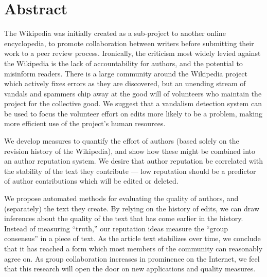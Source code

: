 \chapter{Abstract}
\begin{comment}
WikiTrust: From Quantity to Quality
by
B. Thomas Adler
\end{comment}

The Wikipedia was initially created as a sub-project to another
online encyclopedia, to promote collaboration between writers
before submitting their work to a peer review process.
Ironically, the criticism most widely levied against the Wikipedia
is the lack of accountability
for authors, and the potential to misinform readers.
There is a large community around the Wikipedia project which actively
fixes errors as they are discovered, but an unending
stream of vandals and spammers chip
away at the good will of volunteers who
maintain the project for the collective good.
We suggest that a vandalism detection system
can be used to focus
the volunteer effort on edits more likely to be a problem,
making more efficient use of the project's human resources.

We develop measures to quantify the effort of authors
(based solely on the revision history of the Wikipedia),
and show how these might be combined into an author
reputation system.
We desire that author reputation be correlated with the
stability of the text they contribute ---
low reputation should be a predictor of author
contributions which will be edited or deleted.

We propose automated methods for evaluating the quality of
authors, and (separately) the text they create.
By relying on the history of edits, we can draw inferences about
the quality of the text that has come earlier in the history.
Instead of measuring ``truth,'' our reputation ideas
measure the ``group consensus'' in a piece of text.
As the article text stabilizes over time, we conclude that
it has reached a form which most members of the community can
reasonably agree on.
As group collaboration increases in prominence on the Internet,
we feel that this research will open the door on new applications
and quality measures.

